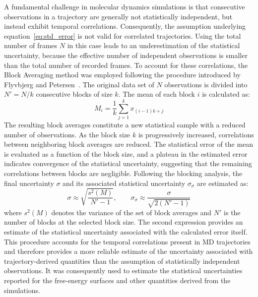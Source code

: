 A fundamental challenge in molecular dynamics simulations is that consecutive observations in a trajectory are generally not statistically independent, but instead exhibit temporal correlations. Consequently, the assumption underlying equation~\ref{eq:std_error} is not valid for correlated trajectories. Using the total number of frames $N$ in this case leads to an underestimation of the statistical uncertainty, because the effective number of independent observations is smaller than the total number of recorded frames.
To account for these correlations, the Block Averaging method was employed following the procedure introduced by Flyvbjerg and Petersen~\cite{block_average}. The original data set of $N$ observations is divided into $N'=N/k$ consecutive blocks of size $k$. The mean of each block $i$ is calculated as:
\begin{equation}
M_i =
\frac{1}{k}
\sum_{j=1}^{k}
x_{(i-1)k+j}
\end{equation}
The resulting block averages constitute a new statistical sample with a reduced number of observations. As the block size $k$ is progressively increased, correlations between neighboring block averages are reduced. The statistical error of the mean is evaluated as a function of the block size, and a plateau in the estimated error indicates convergence of the statistical uncertainty, suggesting that the remaining correlations between blocks are negligible.
Following the blocking analysis, the final uncertainty $\sigma$ and its associated statistical uncertainty $\sigma_{\sigma}$ are estimated as:
\begin{equation}
\sigma
\approx
\sqrt{\frac{s^2(M)}{N'-1}},
\qquad
\sigma_{\sigma}
\approx
\frac{\sigma}{\sqrt{2(N'-1)}}
\end{equation}
where $s^2(M)$ denotes the variance of the set of block averages and $N'$ is the number of blocks at the selected block size. The second expression provides an estimate of the statistical uncertainty associated with the calculated error itself.
This procedure accounts for the temporal correlations present in MD trajectories and therefore provides a more reliable estimate of the uncertainty associated with trajectory-derived quantities than the assumption of statistically independent observations. It was consequently used to estimate the statistical uncertainties reported for the free-energy surfaces and other quantities derived from the simulations.




